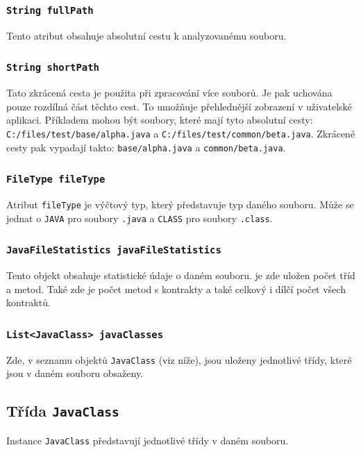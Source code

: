 				\subsubsection{\texttt{String fullPath}}
					Tento atribut obsahuje absolutní cestu k analyzovanému souboru.
					
				\subsubsection{\texttt{String shortPath}}
					Tato zkrácená cesta je použita při zpracování více souborů. Je pak uchována pouze rozdílná část těchto cest. To umožňuje přehlednější zobrazení v uživatelské aplikaci. Příkladem mohou být soubory, které mají tyto absolutní cesty: \texttt{C:/files/test/base/alpha.java} a \texttt{C:/files/test/common/beta.java}. Zkrácené cesty pak vypadají takto: \texttt{base/alpha.java} a \texttt{common/beta.java}.
					
				\subsubsection{\texttt{FileType fileType}}
					Atribut \texttt{fileType} je výčtový typ, který představuje typ daného souboru. Může se jednat o \texttt{JAVA} pro soubory \texttt{.java} a \texttt{CLASS} pro soubory \texttt{.class}.
					
				\subsubsection{\texttt{JavaFileStatistics javaFileStatistics}}
					Tento objekt obsahuje statistické údaje o daném souboru. je zde uložen počet tříd a metod. Také zde je počet metod s kontrakty a také celkový i dílčí počet všech kontraktů.
					
				\subsubsection{\texttt{List<JavaClass> javaClasses}}
					Zde, v seznamu objektů \texttt{JavaClass} (viz níže), jsou uloženy jednotlivé třídy, které jsou v daném souboru obsaženy.
			
			
			\subsection{Třída \texttt{JavaClass}}
				Instance \texttt{JavaClass} představují jednotlivé třídy v daném souboru.
				
